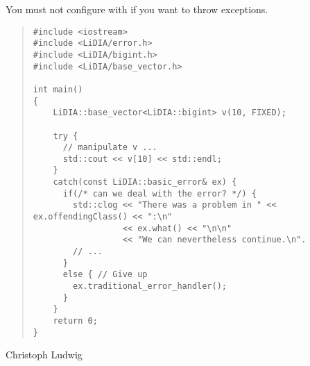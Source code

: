 
\SEEALSO
{}



\WARNINGS

You must not configure \LiDIA with  if you want
\LiDIA to throw exceptions.


\EXAMPLES

\begin{quote}
\begin{verbatim}
#include <iostream>
#include <LiDIA/error.h>
#include <LiDIA/bigint.h>
#include <LiDIA/base_vector.h>

int main()
{
    LiDIA::base_vector<LiDIA::bigint> v(10, FIXED);

    try {
      // manipulate v ...
      std::cout << v[10] << std::endl;
    }
    catch(const LiDIA::basic_error& ex) {
      if(/* can we deal with the error? */) {
        std::clog << "There was a problem in " << ex.offendingClass() << ":\n"
                  << ex.what() << "\n\n"
                  << "We can nevertheless continue.\n".
        // ...
      }
      else { // Give up
        ex.traditional_error_handler();
      }
    }
    return 0;
}
\end{verbatim}
\end{quote}



\AUTHOR

Christoph Ludwig



